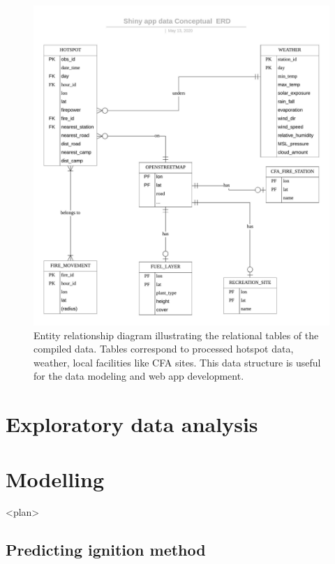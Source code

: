 \documentclass{monashthesis}
\begin{document}
\begin{figure}
\centering
\includegraphics{figures/Shiny_app_data_Conceptual_ERD.jpeg}
\caption{Entity relationship diagram illustrating the relational tables
of the compiled data. Tables correspond to processed hotspot data,
weather, local facilities like CFA sites. This data structure is useful
for the data modeling and web app development. \label{fig:ERD}}
\end{figure}

\chapter{Exploratory data analysis}\label{exploratory-data-analysis}

\chapter{Modelling}\label{modelling}

\textless{}plan\textgreater{}

\section{Predicting ignition method}\label{predicting-ignition-method}
\end{document}

